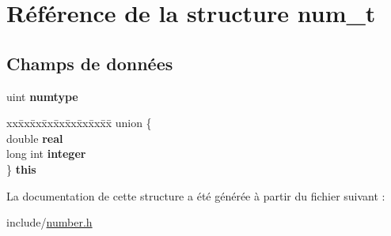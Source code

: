 \hypertarget{structnum__t}{}\section{Référence de la structure num\+\_\+t}
\label{structnum__t}
\subsection*{Champs de données}
\begin{DoxyCompactItemize}
\item 
\hypertarget{structnum__t_adb4ea5cacb51e0ecb72c166358868b05}{}\label{structnum__t_adb4ea5cacb51e0ecb72c166358868b05} 
uint {\bfseries numtype}
\item 
\hypertarget{structnum__t_a3585eefc338ec701eb6f57b1c2391cfd}{}\label{structnum__t_a3585eefc338ec701eb6f57b1c2391cfd} 
\begin{tabbing}
xx\=xx\=xx\=xx\=xx\=xx\=xx\=xx\=xx\=\kill
union \{\\
\>double {\bfseries real}\\
\>long int {\bfseries integer}\\
\} {\bfseries this}\\

\end{tabbing}\end{DoxyCompactItemize}


La documentation de cette structure a été générée à partir du fichier suivant \+:\begin{DoxyCompactItemize}
\item 
include/\hyperlink{number_8h}{number.\+h}\end{DoxyCompactItemize}
